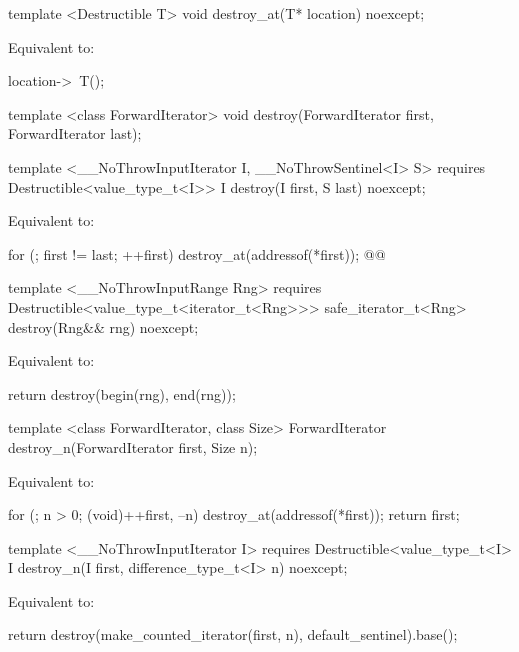 {\color{addclr}
\begin{codeblock}
template <Destructible T>
void destroy_at(T* location) noexcept;
\end{codeblock}
} %

\setcounter{Paras}{0}
\pnum
\effects Equivalent to:
\begin{codeblock}
    location->~T();
\end{codeblock}

{\color{remclr}
\begin{codeblock}
template <class ForwardIterator>
  void destroy(ForwardIterator first, ForwardIterator last);
\end{codeblock}
} %

{\color{addclr}
\begin{codeblock}
template <__NoThrowInputIterator I, __NoThrowSentinel<I> S>
requires
  Destructible<value_type_t<I>>
I destroy(I first, S last) noexcept;
\end{codeblock}
} %

\pnum
\effects Equivalent to:
\begin{codeblock}
    for (; first != last; ++first)
      destroy_at(addressof(*first));
    @@
\end{codeblock}

{\color{addclr}
\begin{codeblock}
template <__NoThrowInputRange Rng>
requires
  Destructible<value_type_t<iterator_t<Rng>>>
safe_iterator_t<Rng> destroy(Rng&& rng) noexcept;
\end{codeblock}

\pnum
\effects Equivalent to:
\begin{codeblock}
    return destroy(begin(rng), end(rng));
\end{codeblock}
} %

{\color{remclr}
\begin{codeblock}
template <class ForwardIterator, class Size>
  ForwardIterator destroy_n(ForwardIterator first, Size n);
\end{codeblock}

\setcounter{Paras}{2}
\pnum
\effects Equivalent to:
\begin{codeblock}
      for (; n > 0; (void)++first, --n)
          destroy_at(addressof(*first));
        return first;
\end{codeblock}
} %

{\color{addclr}
\begin{codeblock}
template <__NoThrowInputIterator I>
requires
  Destructible<value_type_t<I>
I destroy_n(I first, difference_type_t<I> n) noexcept;
\end{codeblock}

\pnum
\effects Equivalent to:
\begin{codeblock}
    return destroy(make_counted_iterator(first, n), default_sentinel{}).base();
\end{codeblock}
} %